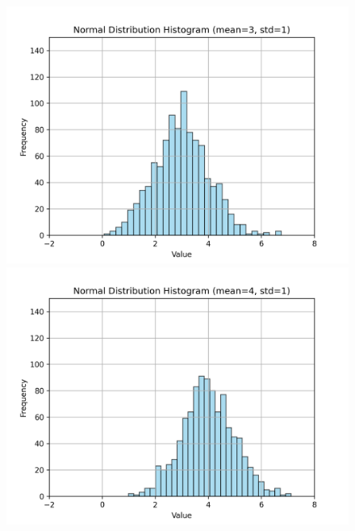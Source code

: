 \documentclass[a4paper,12pt]{article}
\begin{document}
\begin{figure}[h!]
\begin{minipage}{0.2\textwidth}
        \includegraphics[width=\textwidth]{./Screenshots/Exercise6.3.png}
    \end{minipage}%
    \hfill
    \begin{minipage}{0.2\textwidth}
        \centering
        \includegraphics[width=\textwidth]{./Screenshots/Exercise6.4.png}
    \end{minipage}%
    \hfill
    \begin{minipage}{0.2\textwidth}
        \centering

\end{minipage}
\end{figure}
\end{document}
